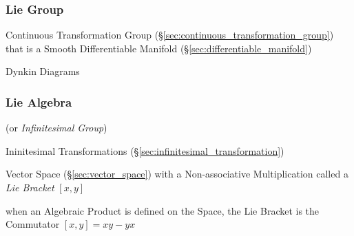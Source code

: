 \subsubsection{Lie Group}\label{sec:lie_group}\hfill

Continuous Transformation Group
(\S\ref{sec:continuous_transformation_group}) that is a Smooth
Differentiable Manifold (\S\ref{sec:differentiable_manifold})

Dynkin Diagrams



\subsubsection{Lie Algebra}\label{sec:lie_algebra}

(or \emph{Infinitesimal Group})

Ininitesimal Transformations
(\S\ref{sec:infinitesimal_transformation})

Vector Space (\S\ref{sec:vector_space}) with a Non-associative
Multiplication called a \emph{Lie Bracket} $[x,y]$

when an Algebraic Product is defined on the Space, the Lie Bracket is
the Commutator $[x,y] = xy - yx$ %
